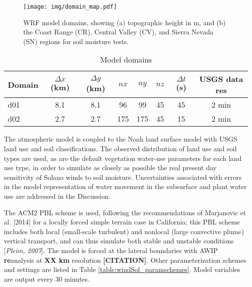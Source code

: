 \begin{figure}[here]
\texttt{[image: img/domain\_map.pdf]}
\caption{WRF model domains, showing (a) topographic height in m, and (b) the Coast Range (CR), Central Valley (CV), and Sierra Nevada (SN) regions for soil moisture tests.}
\label{fig:windSol_domainmap}
\end{figure}

\begin{table}
\begin{tabular}{ l c c c c c c c }
\hline
Domain & $\Delta x$ (km) & $\Delta y$ (km) & $nx$ & $ny$ & $nz$ & $\Delta t$ (s) & USGS data res \\ \hline
d01 & 8.1 & 8.1 & 96 & 99 & 45 & 45 & 2 min\\
d02 & 2.7 & 2.7 & 175 & 175 & 45 & 15 & 2 min\\
\hline
\end{tabular}
\caption{Model domains}
\label{table:windSol_domains}
\end{table}

The atmospheric model is coupled to the Noah land surface model with USGS land use and soil classifications.  The observed distribution of land use and soil types are used, as are the default vegetation water-use parameters for each land use type, in order to simulate as closely as possible the real present day sensitivity of Solano winds to soil moisture.  Uncertainties associated with errors in the model representation of water movement in the subsurface and plant water use are addressed in the Discussion. 

The ACM2 PBL scheme is used, following the recommendations of Marjanovic et al. [2014] for a locally forced simple terrain case in California; this PBL scheme includes both local (small-scale turbulent) and nonlocal (large convective plume) vertical transport, and can thus simulate both stable and unstable conditions [\textit{Pleim, 2007}].  The model is forced at the lateral boundaries with AWIP \textbf{re}analysis at \textbf{XX km} resolution \textbf{[CITATION]}.  Other parameterization schemes and settings are listed in Table \ref{table:windSol_paramschemes}.  Model variables are output every 30 minutes.

